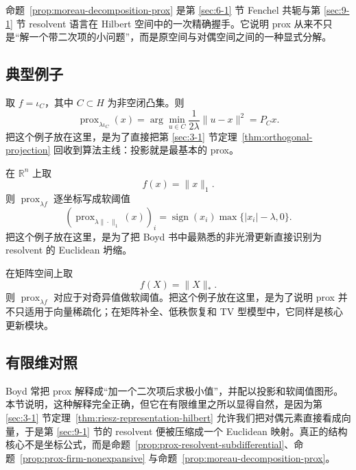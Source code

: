 \begin{remark}
命题~\ref{prop:moreau-decomposition-prox} 是第 \ref{sec:6-1} 节 Fenchel 共轭与第 \ref{sec:9-1} 节 resolvent 语言在 Hilbert 空间中的一次精确握手。它说明 prox 从来不只是“解一个带二次项的小问题”，而是原空间与对偶空间之间的一种显式分解。
\end{remark}

\subsection{典型例子}

\begin{example}[闭凸集投影]
取 $f=\iota_C$，其中 $C\subset H$ 为非空闭凸集。则
\[
\operatorname{prox}_{\lambda \iota_C}(x)
=
\arg\min_{u\in C}\frac{1}{2\lambda}\|u-x\|^2
=
P_Cx.
\]
把这个例子放在这里，是为了直接把第 \ref{sec:3-1} 节定理~\ref{thm:orthogonal-projection} 回收到算法主线：投影就是最基本的 prox。
\end{example}

\begin{example}
在 $\mathbb R^n$ 上取
\[
f(x)=\|x\|_1.
\]
则 $\operatorname{prox}_{\lambda f}$ 逐坐标写成软阈值
\[
(\operatorname{prox}_{\lambda\|\cdot\|_1}(x))_i
=
\operatorname{sign}(x_i)\max\{|x_i|-\lambda,0\}.
\]
把这个例子放在这里，是为了把 Boyd 书中最熟悉的非光滑更新直接识别为 resolvent 的 Euclidean 坍缩。
\end{example}

\begin{example}[核范数与奇异值阈值]
在矩阵空间上取
\[
f(X)=\|X\|_\ast.
\]
则 $\operatorname{prox}_{\lambda f}$ 对应于对奇异值做软阈值。把这个例子放在这里，是为了说明 prox 并不只适用于向量稀疏化；在矩阵补全、低秩恢复和 TV 型模型中，它同样是核心更新模块。
\end{example}

\subsection*{有限维对照}

Boyd 常把 prox 解释成“加一个二次项后求极小值”，并配以投影和软阈值图形。本节说明，这种解释完全正确，但它在有限维里之所以显得自然，是因为第 \ref{sec:3-1} 节定理~\ref{thm:riesz-representation-hilbert} 允许我们把对偶元素直接看成向量，于是第 \ref{sec:9-1} 节的 resolvent 便被压缩成一个 Euclidean 映射。真正的结构核心不是坐标公式，而是命题~\ref{prop:prox-resolvent-subdifferential}、命题~\ref{prop:prox-firm-nonexpansive} 与命题~\ref{prop:moreau-decomposition-prox}。

